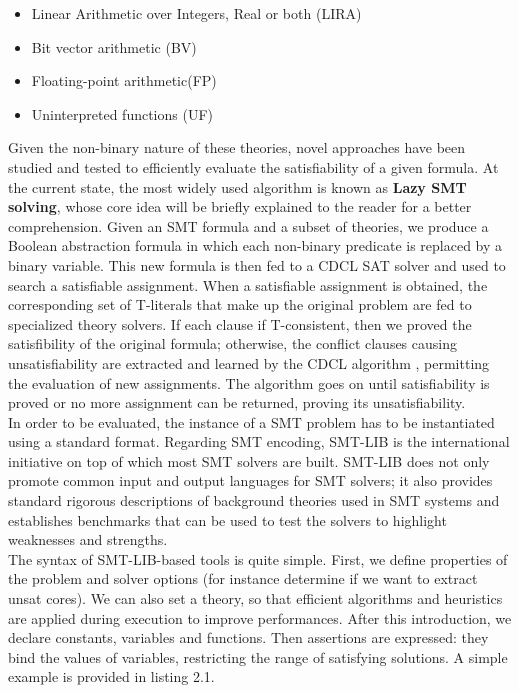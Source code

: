 \begin{itemize}
    \item Linear Arithmetic over Integers, Real or both (LIRA)
    \item Bit vector arithmetic (BV)
    \item Floating-point arithmetic(FP)
    \item Uninterpreted functions (UF)
\end{itemize}

Given the non-binary nature of these theories, novel approaches have been studied and tested to efficiently evaluate the satisfiability of a given formula. At the current state, the most widely used algorithm is known as \textbf{Lazy SMT solving}\cite{lazysmt}, whose core idea will be briefly explained to the reader for a better comprehension. Given an SMT formula and a subset of theories, we produce a Boolean abstraction formula in which each non-binary predicate is replaced by a binary variable. This new formula is then fed to a CDCL SAT solver and used to search a satisfiable assignment. When a satisfiable assignment is obtained, the corresponding set of T-literals that make up the original problem are fed to specialized theory solvers. If each clause if T-consistent, then we proved the satisfibility of the original formula; otherwise, the conflict clauses causing unsatisfiability are extracted and learned by the CDCL algorithm , permitting the evaluation of new assignments. The algorithm goes on until satisfiability is proved or no more assignment can be returned, proving its unsatisfiability. \\
In order to be evaluated, the instance of a SMT problem has to be instantiated using a standard format. Regarding SMT encoding, SMT-LIB is the international initiative on top of which most SMT solvers are built. SMT-LIB does not only promote common input and output languages for SMT solvers; it also provides standard rigorous descriptions of background theories used in SMT systems and establishes benchmarks that can be used to test the solvers to highlight weaknesses and strengths. \\
The syntax of SMT-LIB-based tools is quite simple. First, we define properties of the problem and solver options (for instance determine if we want to extract unsat cores). We can also set a theory, so that efficient algorithms and heuristics are applied during execution to improve performances. After this introduction, we declare constants, variables and functions. Then assertions are expressed: they bind the values of variables, restricting the range of satisfying solutions. A simple example is provided in listing 2.1. \\
